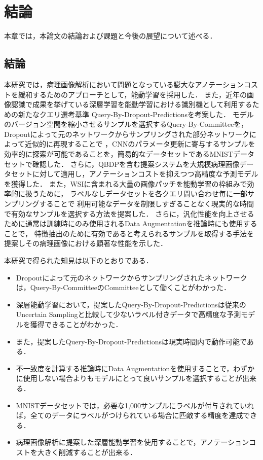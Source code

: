\section{結論}
本章では，本論文の結論および課題と今後の展望について述べる．

\subsection{結論}
本研究では，病理画像解析において問題となっている膨大なアノテーションコストを緩和するためのアプローチとして，能動学習を採用した．
また，近年の画像認識で成果を挙げている深層学習を能動学習における識別機として利用するための新たなクエリ選考基準 Query-By-Dropout-Predictionsを考案した．
モデルのバージョン空間を縮小させるサンプルを選択するQuery-By-Committeeを，Dropoutによって元のネットワークからサンプリングされた部分ネットワークによって近似的に再現することで
，CNNのパラメータ更新に寄与するサンプルを効率的に探索が可能であることを，簡易的なデータセットであるMNISTデータセットで確認した．
さらに，QBDPを含む提案システムを大規模病理画像データセットに対して適用し，アノテーションコストを抑えつつ高精度な予測モデルを獲得した．
また，WSIに含まれる大量の画像パッチを能動学習の枠組みで効率的に扱うために，
ラベルなしデータセットを各クエリ問い合わせ毎に一部サンプリングすることで
利用可能なデータを制限しすぎることなく現実的な時間で有効なサンプルを選択する方法を提案した．
さらに，汎化性能を向上させるために通常は訓練時にのみ使用されるData Augmentationを推論時にも使用することで，
特徴抽出のために有効であると考えられるサンプルを取得する手法を提案しその病理画像における顕著な性能を示した．

本研究で得られた知見は以下のとおりである．
\begin{itemize}
\item Dropoutによって元のネットワークからサンプリングされたネットワークは，Query-By-CommitteeのCommitteeとして働くことがわかった．
\item 深層能動学習において，提案したQuery-By-Dropout-Predictionsは従来のUncertain Samplingと比較して少ないラベル付きデータで高精度な予測モデルを獲得できることがわかった．
\item また，提案したQuery-By-Dropout-Predictionsは現実時間内で動作可能である．
\item 不一致度を計算する推論時にData Augmentationを使用することで，わずかに使用しない場合よりもモデルにとって良いサンプルを選択することが出来る．
\item MNISTデータセットでは，必要な1,000サンプルにラベルが付与されていれば，全てのデータにラベルがつけられている場合に匹敵する精度を達成できる．
\item 病理画像解析に提案した深層能動学習を使用することで，アノテーションコストを大きく削減することが出来る．
\end{itemize}

